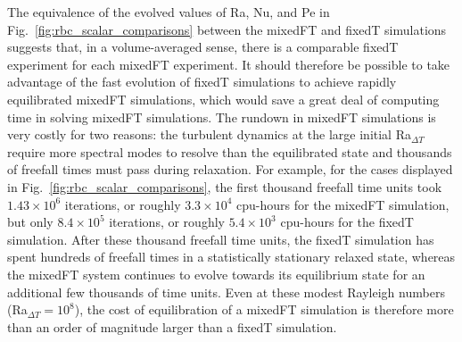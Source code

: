 \documentclass[aps, pre, onecolumn, nofootinbib, notitlepage, groupedaddress, amsfonts, amssymb, amsmath, longbibliography, superscriptaddress]{revtex4-1}
\begin{document}
The equivalence of the evolved values of Ra, Nu, and Pe in Fig.~\ref{fig:rbc_scalar_comparisons} between the mixedFT and fixedT simulations suggests that, in a volume-averaged sense, there is a comparable fixedT experiment for each mixedFT experiment.
It should therefore be possible to take advantage of the fast evolution of fixedT simulations to achieve rapidly equilibrated mixedFT simulations, which would save a great deal of computing time in solving mixedFT simulations.
The rundown in mixedFT simulations is very costly for two reasons: the turbulent dynamics at the large initial Ra$_{\Delta T}$ require more spectral modes to resolve than the equilibrated state and thousands of freefall times must pass during relaxation.
For example, for the cases displayed in Fig.~\ref{fig:rbc_scalar_comparisons}, the first thousand freefall time units took $1.43\times10^6$ iterations, or roughly $3.3 \times 10^4$ cpu-hours for the mixedFT simulation, but only  $8.4\times10^5$ iterations, or roughly $5.4\times 10^3$ cpu-hours for the fixedT simulation.
After these thousand freefall time units, the fixedT simulation has spent hundreds of freefall times in a statistically stationary relaxed state, whereas the mixedFT system continues to evolve towards its equilibrium state for an additional few thousands of time units.
Even at these modest Rayleigh numbers (Ra$_{\Delta T} = 10^8$), the cost of equilibration of a mixedFT simulation is therefore more than an order of magnitude larger than a fixedT simulation.
\end{document}
